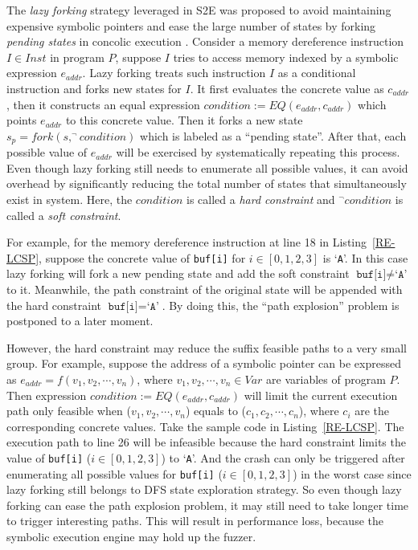 \documentclass{cta-author}
\begin{document}
The \textit{lazy forking} strategy leveraged in S2E was proposed to avoid 
maintaining expensive symbolic pointers and ease the large number 
of states by forking \textit{pending states} in concolic 
execution \cite{chipounov2011s2e}. 
Consider a memory dereference instruction $I\in Inst$ in program $P$, 
suppose $I$ tries to access memory indexed by a symbolic expression 
$e_{addr}$.
Lazy forking treats such instruction $I$ as a conditional instruction 
and forks new states for $I$. It first evaluates the concrete value 
as $c_{addr}$, then it constructs an equal
expression $condition:= EQ(e_{addr}, c_{addr})$ 
which points $e_{addr}$ to this concrete value. Then it forks a 
new state $s_p=fork(s, ^\neg condition)$ which is labeled as a 
``pending state''. After that, each possible value of $e_{addr}$ 
will be exercised by systematically repeating this process. Even 
though lazy forking still needs to enumerate all possible values, 
it can avoid overhead by significantly reducing the total number 
of states that simultaneously exist in system. Here, 
the $condition$ is called a \textit{hard constraint} and 
$^\neg condition$ is called a \textit{soft constraint}.

For example, for the memory dereference instruction at line 18 
in Listing~\ref{RE-LCSP}, suppose the concrete value of 
\texttt{buf[i]} for $i\in[0,1,2,3]$ is `\texttt{A}'. 
In this case lazy forking will fork a new pending state and 
add the soft constraint $\texttt{buf[i]}\neq\texttt{`A'}$ to 
it. Meanwhile, the path constraint of the original state will 
be appended with the hard constraint $\texttt{buf[i]}=\texttt{`A'}$.
By doing this, the ``path explosion'' problem is postponed to a later moment.

However, the hard constraint may reduce the suffix feasible paths 
to a very small group. For example, suppose the address of a symbolic 
pointer can be expressed as $e_{addr}=f(v_1, v_2,\cdots, v_n)$, 
where $v_1, v_2,\cdots, v_n\in Var$ are variables of program $P$. 
Then expression $condition:= EQ(e_{addr}, c_{addr})$ will limit 
the current execution path only feasible when ($v_1, v_2,\cdots, v_n$) 
equals to ($c_1, c_2,\cdots, c_n$), where $c_i$ are the 
corresponding concrete values. 
Take the sample code in Listing~\ref{RE-LCSP}. The execution path 
to line 26 will be infeasible because the hard constraint limits 
the value of \texttt{buf[i]} ($i\in[0,1,2,3]$) to `\texttt{A}'. 
And the crash can only be triggered after enumerating all possible 
values for \texttt{buf[i]} ($i\in[0,1,2,3]$) in the worst case since
lazy forking still belongs to DFS state exploration strategy.
So even though lazy forking can ease the path explosion problem, 
it may still need to take longer time to trigger interesting paths. 
This will result in performance loss, because the symbolic 
execution engine may hold up the fuzzer. 
\end{document}
